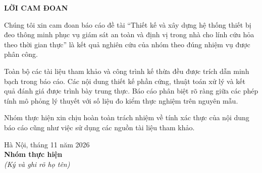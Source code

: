 \clearpage\thispagestyle{empty}
\begin{center}\bfseries LỜI CAM ĐOAN\end{center}
Chúng tôi xin cam đoan báo cáo đề tài ``Thiết kế và xây dựng hệ thống thiết bị đeo thông minh phục vụ giám sát an toàn và định vị trong nhà cho lính cứu hỏa theo thời gian thực'' là kết quả nghiên cứu của nhóm theo đúng nhiệm vụ được phân công.

Toàn bộ các tài liệu tham khảo và công trình kế thừa đều được trích dẫn minh bạch trong báo cáo. Các nội dung thiết kế phần cứng, thuật toán xử lý và kết quả đánh giá được trình bày trung thực. Báo cáo phân biệt rõ ràng giữa các phép tính mô phỏng lý thuyết với số liệu đo kiểm thực nghiệm trên nguyên mẫu.

Nhóm thực hiện xin chịu hoàn toàn trách nhiệm về tính xác thực của nội dung báo cáo cũng như việc sử dụng các nguồn tài liệu tham khảo.
\vspace{18bp}
\begin{flushright}\begin{minipage}{180bp}\centering
Hà Nội, tháng 11 năm 2026\\[6bp]
\textbf{Nhóm thực hiện}\\
{\fontsize{12bp}{15bp}\selectfont\itshape (Ký và ghi rõ họ tên)}\\[45bp]
\end{minipage}\end{flushright}
\clearpage